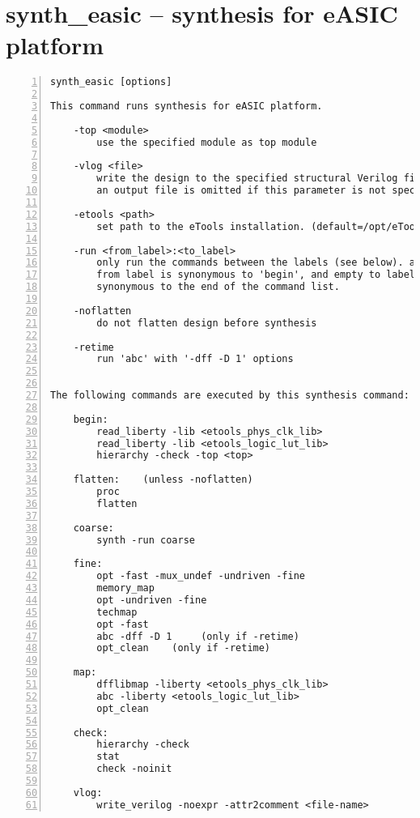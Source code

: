 \section{synth\_easic -- synthesis for eASIC platform}
\label{cmd:synth_easic}
\begin{lstlisting}[numbers=left,frame=single]
    synth_easic [options]

This command runs synthesis for eASIC platform.

    -top <module>
        use the specified module as top module

    -vlog <file>
        write the design to the specified structural Verilog file. writing of
        an output file is omitted if this parameter is not specified.

    -etools <path>
        set path to the eTools installation. (default=/opt/eTools)

    -run <from_label>:<to_label>
        only run the commands between the labels (see below). an empty
        from label is synonymous to 'begin', and empty to label is
        synonymous to the end of the command list.

    -noflatten
        do not flatten design before synthesis

    -retime
        run 'abc' with '-dff -D 1' options


The following commands are executed by this synthesis command:

    begin:
        read_liberty -lib <etools_phys_clk_lib>
        read_liberty -lib <etools_logic_lut_lib>
        hierarchy -check -top <top>

    flatten:    (unless -noflatten)
        proc
        flatten

    coarse:
        synth -run coarse

    fine:
        opt -fast -mux_undef -undriven -fine
        memory_map
        opt -undriven -fine
        techmap
        opt -fast
        abc -dff -D 1     (only if -retime)
        opt_clean    (only if -retime)

    map:
        dfflibmap -liberty <etools_phys_clk_lib>
        abc -liberty <etools_logic_lut_lib>
        opt_clean

    check:
        hierarchy -check
        stat
        check -noinit

    vlog:
        write_verilog -noexpr -attr2comment <file-name>
\end{lstlisting}

